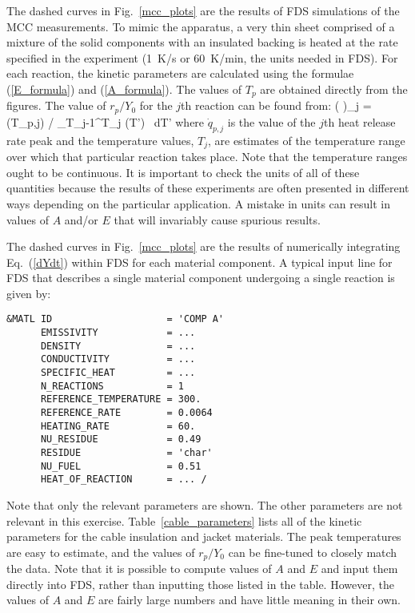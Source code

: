\documentclass[11pt]{book}
\begin{document}
The dashed curves in Fig.~\ref{mcc_plots} are the results of FDS simulations of the MCC measurements. To mimic the
apparatus, a very thin sheet comprised of a mixture of the solid components with an insulated backing is heated at the
rate specified in the experiment (1~K/s or 60~K/min, the units needed in FDS).
For each reaction,
the kinetic parameters are calculated using the formulae (\ref{E_formula}) and (\ref{A_formula}). The values of
$T_p$ are obtained directly from the figures. The value of $r_p/Y_0$ for the $j$th reaction can be found from:
\be
   \left(  \right)_j = \beta \, (T_{p,j}) \Big/ \int_{T_{j-1}}^{T_j} (T') \, dT'  \label{r_formula}
\ee
where $\dot{q}_{p,j}$ is the value of the $j$th heat release rate peak and the temperature values, $T_j$, are estimates
of the temperature range over which that particular reaction takes place. Note that the temperature ranges ought to be
continuous.
It is important to check the units of all of these quantities because the
results of these experiments are often presented in different ways depending on the particular application. A mistake
in units can result in values of $A$ and/or $E$ that will invariably cause spurious results.

The dashed curves in Fig.~\ref{mcc_plots} are the results of numerically integrating Eq.~(\ref{dYdt}) within FDS for each
material component. A typical input line for FDS that describes a single material component undergoing a single
reaction is given by:

\footnotesize
\begin{verbatim}
&MATL ID                    = 'COMP A'
      EMISSIVITY            = ...
      DENSITY               = ...
      CONDUCTIVITY          = ...
      SPECIFIC_HEAT         = ...
      N_REACTIONS           = 1
      REFERENCE_TEMPERATURE = 300.
      REFERENCE_RATE        = 0.0064
      HEATING_RATE          = 60.
      NU_RESIDUE            = 0.49
      RESIDUE               = 'char'
      NU_FUEL               = 0.51
      HEAT_OF_REACTION      = ... /
\end{verbatim} \normalsize

\noindent Note that only the relevant parameters are shown. The other parameters are not relevant in this
exercise. Table~\ref{cable_parameters} lists all of the kinetic parameters for the cable insulation and jacket
materials. The peak temperatures are easy to estimate, and the values of $r_p/Y_0$ can be fine-tuned to closely match
the data. Note that it is possible to compute values of $A$ and $E$ and input them directly into FDS, rather
than inputting those listed in the table. However, the values of $A$ and $E$ are fairly large numbers and have little
meaning in their own.
\end{document}

